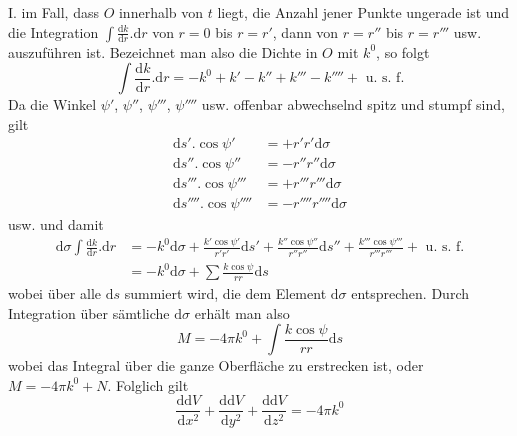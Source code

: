 I. im Fall, dass $O$ innerhalb von $t$ liegt, die Anzahl jener Punkte ungerade ist und die Integration $\int\frac{\mathrm{d}k}{\mathrm{d}r}.\mathrm{d}r$ von $r=0$ bis $r=r'$, dann von $r=r''$ bis $r=r'''$ usw. auszuführen ist. Bezeichnet man also die Dichte in $O$ mit $k^0$, so folgt
\[
\int\frac{\mathrm{d}k}{\mathrm{d}r}.\mathrm{d}r=-k^0+k'-k''+k'''-k''''+\text{ u. s. f.}
\]
Da die Winkel $\psi'$, $\psi''$, $\psi'''$, $\psi''''$ usw. offenbar abwechselnd spitz und stumpf sind, gilt
\[
\begin{aligned}
\mathrm{d}s'.\cos\psi'&=+r'r'\mathrm{d}\sigma\\
\mathrm{d}s''.\cos\psi''&=-r''r''\mathrm{d}\sigma\\
\mathrm{d}s'''.\cos\psi'''&=+r'''r'''\mathrm{d}\sigma\\
\mathrm{d}s''''.\cos\psi''''&=-r''''r''''\mathrm{d}\sigma
\end{aligned}
\]
usw. und damit
\[
\begin{aligned}
\mathrm{d}\sigma\int\frac{\mathrm{d}k}{\mathrm{d}r}.\mathrm{d}r&=-k^0\mathrm{d}\sigma+\frac{k'\cos\psi'}{r'r'}\mathrm{d}s'+\frac{k''\cos\psi''}{r''r''}\mathrm{d}s''+\frac{k'''\cos\psi'''}{r'''r'''}+\text{ u. s. f.}\\
&=-k^0\mathrm{d}\sigma+\sum\frac{k\cos\psi}{rr}\mathrm{d}s
\end{aligned}
\]
wobei über alle $\mathrm{d}s$ summiert wird, die dem Element $\mathrm{d}\sigma$ entsprechen. Durch Integration über sämtliche $\mathrm{d}\sigma$ erhält man also
\[
M=-4\pi k^0+\int\frac{k\cos\psi}{rr}\mathrm{d}s
\]
wobei das Integral über die ganze Oberfläche zu erstrecken ist, oder $M=-4\pi k^0+N$. Folglich gilt
\[
\frac{\mathrm{d}\mathrm{d}V}{\mathrm{d}x^2}+\frac{\mathrm{d}\mathrm{d}V}{\mathrm{d}y^2}+\frac{\mathrm{d}\mathrm{d}V}{\mathrm{d}z^2}=-4\pi k^0
\]

